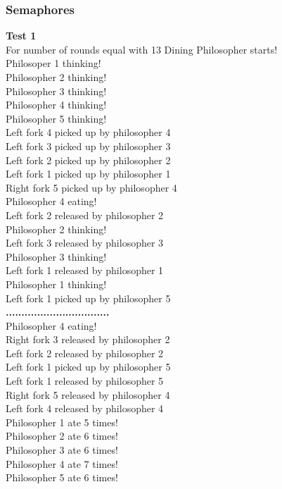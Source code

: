 \documentclass[14pt]{article}
\begin{document}
\subsubsection{Semaphores}
\textbf{Test 1}
\\For number of rounds equal with 13 Dining Philosopher starts!
\\Philosoper 1 thinking!
\\Philosopher 2 thinking!
\\Philosopher 3 thinking!
\\Philosopher 4 thinking!
\\Philosopher 5 thinking!
\\Left fork 4 picked up by philosopher 4
\\Left fork 3 picked up by philosopher 3
\\Left fork 2 picked up by philosopher 2
\\Left fork 1 picked up by philosopher 1
\\Right fork 5 picked up by philosopher 4
\\Philosopher 4 eating!
\\Left fork 2 released by philosopher 2
\\Philosopher 2 thinking!
\\Left fork 3 released by philosopher 3
\\Philosopher 3 thinking!
\\Left fork 1 released by philosopher 1
\\Philosopher 1 thinking!
\\Left fork 1 picked up by philosopher 5
\\\textbf{.................................}
\\Philosopher 4 eating!
\\Right fork 3 released by philosopher 2
\\Left fork 2 released by philosopher 2
\\Left fork 1 picked up by philosopher 5
\\Left fork 1 released by philosopher 5
\\Right fork 5 released by philosopher 4
\\Left fork 4 released by philosopher 4
\\Philosopher 1 ate 5 times!
\\Philosopher 2 ate 6 times!
\\Philosopher 3 ate 6 times!
\\Philosopher 4 ate 7 times!
\\Philosopher 5 ate 6 times!
\end{document}
